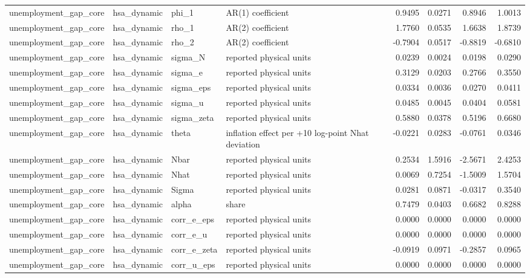 \begin{tabular}{llllrrrr}
unemployment\_gap\_core & hsa\_dynamic & phi\_1 & AR(1) coefficient & 0.9495 & 0.0271 & 0.8946 & 1.0013 \\
unemployment\_gap\_core & hsa\_dynamic & rho\_1 & AR(2) coefficient & 1.7760 & 0.0535 & 1.6638 & 1.8739 \\
unemployment\_gap\_core & hsa\_dynamic & rho\_2 & AR(2) coefficient & -0.7904 & 0.0517 & -0.8819 & -0.6810 \\
unemployment\_gap\_core & hsa\_dynamic & sigma\_N & reported physical units & 0.0239 & 0.0024 & 0.0198 & 0.0290 \\
unemployment\_gap\_core & hsa\_dynamic & sigma\_e & reported physical units & 0.3129 & 0.0203 & 0.2766 & 0.3550 \\
unemployment\_gap\_core & hsa\_dynamic & sigma\_eps & reported physical units & 0.0334 & 0.0036 & 0.0270 & 0.0411 \\
unemployment\_gap\_core & hsa\_dynamic & sigma\_u & reported physical units & 0.0485 & 0.0045 & 0.0404 & 0.0581 \\
unemployment\_gap\_core & hsa\_dynamic & sigma\_zeta & reported physical units & 0.5880 & 0.0378 & 0.5196 & 0.6680 \\
unemployment\_gap\_core & hsa\_dynamic & theta & inflation effect per +10 log-point Nhat deviation & -0.0221 & 0.0283 & -0.0761 & 0.0346 \\
unemployment\_gap\_core & hsa\_dynamic & Nbar & reported physical units & 0.2534 & 1.5916 & -2.5671 & 2.4253 \\
unemployment\_gap\_core & hsa\_dynamic & Nhat & reported physical units & 0.0069 & 0.7254 & -1.5009 & 1.5704 \\
unemployment\_gap\_core & hsa\_dynamic & Sigma & reported physical units & 0.0281 & 0.0871 & -0.0317 & 0.3540 \\
unemployment\_gap\_core & hsa\_dynamic & alpha & share & 0.7479 & 0.0403 & 0.6682 & 0.8288 \\
unemployment\_gap\_core & hsa\_dynamic & corr\_e\_eps & reported physical units & 0.0000 & 0.0000 & 0.0000 & 0.0000 \\
unemployment\_gap\_core & hsa\_dynamic & corr\_e\_u & reported physical units & 0.0000 & 0.0000 & 0.0000 & 0.0000 \\
unemployment\_gap\_core & hsa\_dynamic & corr\_e\_zeta & reported physical units & -0.0919 & 0.0971 & -0.2857 & 0.0965 \\
unemployment\_gap\_core & hsa\_dynamic & corr\_u\_eps & reported physical units & 0.0000 & 0.0000 & 0.0000 & 0.0000 \\

\end{tabular}
